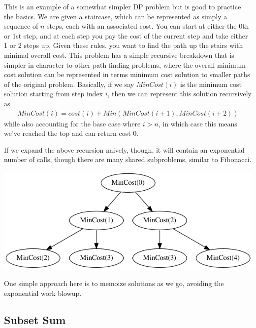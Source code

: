 \documentclass[10pt,a4paper]{article}
\begin{document}
This is an example of a somewhat simpler DP problem but is good to practice the basics. We are given a staircase, which can be represented as simply a sequence of $n$ steps, each with an associated cost. You can start at either the 0th or 1st step, and at each step you pay the cost of the current step and take either 1 or 2 steps up. Given these rules, you want to find the path up the stairs with minimal overall cost. This problem has a simple recursive breakdown that is simpler in character to other path finding problems, where the overall minimum cost solution can be represented in terms minimum cost solution to smaller paths of the original problem. Basically, if we say $\mathit{MinCost}(i)$ is the minimum cost solution starting from step index $i$, then we can represent this solution recursively as
\begin{align*}
    \mathit{MinCost}(i) = cost(i) + \mathit{Min}(\mathit{MinCost}(i+1), \mathit{MinCost}(i+2))
\end{align*}
while also accounting for the base case where $i > n$, in which case this means we've reached the top and can return cost 0.

If we expand the above recursion naively, though, it will contain an exponential number of calls, though there are many shared subproblems, similar to Fibonacci.
\begin{center}
    \includegraphics[scale=0.35]{diagrams/stairs_tree.png}
\end{center}
One simple approach here is to memoize solutions as we go, avoiding the exponential work blowup.


\subsection*{Subset Sum}
\label{sec:subset-sum}
\end{document}
